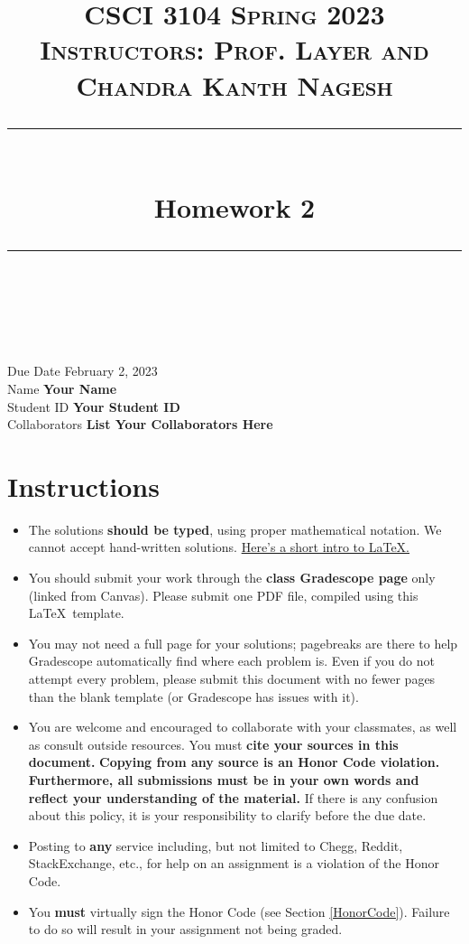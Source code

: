 \documentclass[11pt]{article}
\title{
\normalfont \normalsize 
\textsc{CSCI 3104 Spring 2023 \\ 
Instructors: Prof. Layer and Chandra Kanth Nagesh} \\
[10pt] 
\rule{\linewidth}{0.5pt} \\[6pt] 
\huge Homework 2 \\
\rule{\linewidth}{2pt}  \\[10pt]
}
\date{}
\theoremstyle{definition}
\theoremstyle{definition}
\theoremstyle{definition}
\begin{document}
\maketitle


\noindent
Due Date \dotfill February 2, 2023 \\
Name \dotfill \textbf{Your Name} \\
Student ID \dotfill \textbf{Your Student ID} \\
Collaborators \dotfill \textbf{List Your Collaborators Here}

\tableofcontents

\section{Instructions}
 \begin{itemize}
	\item The solutions \textbf{should be typed}, using proper mathematical notation. We cannot accept hand-written solutions. \href{http://ece.uprm.edu/~caceros/latex/introduction.pdf}{Here's a short intro to \LaTeX.}
	\item You should submit your work through the \textbf{class Gradescope page} only (linked from Canvas). Please submit one PDF file, compiled using this \LaTeX \ template.
	\item You may not need a full page for your solutions; pagebreaks are there to help Gradescope automatically find where each problem is. Even if you do not attempt every problem, please submit this document with no fewer pages than the blank template (or Gradescope has issues with it).

	\item You are welcome and encouraged to collaborate with your classmates, as well as consult outside resources. You must \textbf{cite your sources in this document.} \textbf{Copying from any source is an Honor Code violation. Furthermore, all submissions must be in your own words and reflect your understanding of the material.} If there is any confusion about this policy, it is your responsibility to clarify before the due date. 

	\item Posting to \textbf{any} service including, but not limited to Chegg, Reddit, StackExchange, etc., for help on an assignment is a violation of the Honor Code.

	\item You \textbf{must} virtually sign the Honor Code (see Section \ref{HonorCode}). Failure to do so will result in your assignment not being graded.
\end{itemize}
\end{document}
